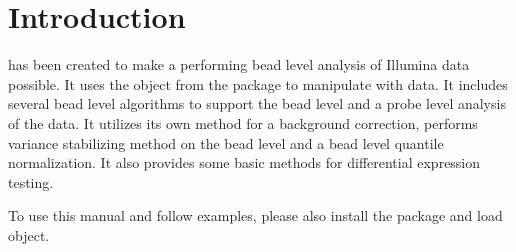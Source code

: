 \section{Introduction}
 has been created to make a performing bead level analysis of Illumina data possible. It uses the object  from the package  to manipulate with data. It includes several bead level algorithms to support the bead level and a probe level analysis of the data. It utilizes its own method for a background correction, performs variance stabilizing method on the bead level and a bead level quantile normalization. It also provides some basic methods for differential expression testing.

To use this manual and follow examples, please also install the package  and load  object.

